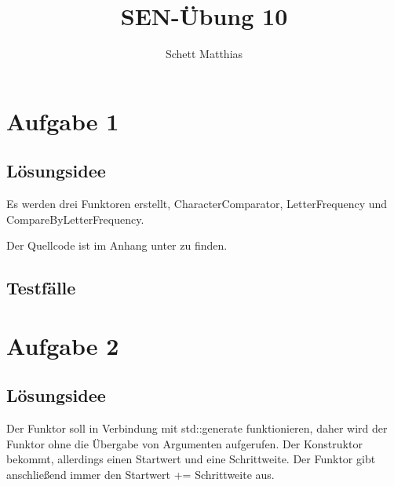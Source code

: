 \documentclass[a4paper,oneside,openany]{tufte-book}
\author{Schett Matthias}
\title{SEN-\"{U}bung 10}
\begin{document}


\frontmatter

\maketitle
\tableofcontents
\mainmatter

\chapter{Aufgabe 1}

\section{L\"{o}sungsidee}

Es werden drei Funktoren erstellt, CharacterComparator, LetterFrequency und CompareByLetterFrequency.

Der Quellcode ist im Anhang unter  zu finden.

\section{Testf\"{a}lle}



\chapter{Aufgabe 2}

\section{L\"{o}sungsidee}

Der Funktor soll in Verbindung mit std::generate funktionieren, daher wird der Funktor ohne die Übergabe von Argumenten aufgerufen. Der Konstruktor bekommt, allerdings einen Startwert
und eine Schrittweite. Der Funktor gibt anschließend immer den Startwert += Schrittweite aus.
\end{document}
